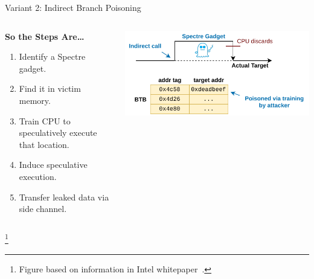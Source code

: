 \documentclass[10pt, dvipsnames, aspectratio=169]{beamer}
\newcommand\ufootnote[1]{%
    \begingroup
        \renewcommand\thefootnote{}\footnote{\hspace{-1.8em}#1}%
        \addtocounter{footnote}{-1}%
    \endgroup
}
\begin{document}
\begingroup
\setwatermark{}
\begin{frame}[c]{Variant 2: Indirect Branch Poisoning}{}
  \begin{columns}
    \begin{column}{0.5\textwidth}
      {\bf So the Steps Are\ldots}
      \begin{enumerate}
        \item Identify a Spectre gadget.
        \item Find it in victim memory.
        \item Train CPU to speculatively execute that location.
        \item Induce speculative execution.
        \item Transfer leaked data via side channel.
      \end{enumerate}
    \end{column}

    \begin{column}{0.5\textwidth}
      \color{black}%
      \includegraphics[width=1\columnwidth]{figs/indirect.pdf}%
    \end{column}
  \end{columns}

  \ufootnote{Figure based on information in Intel whitepaper~\cite{intel_retpoline}.}
\end{frame}
\endgroup
\end{document}
